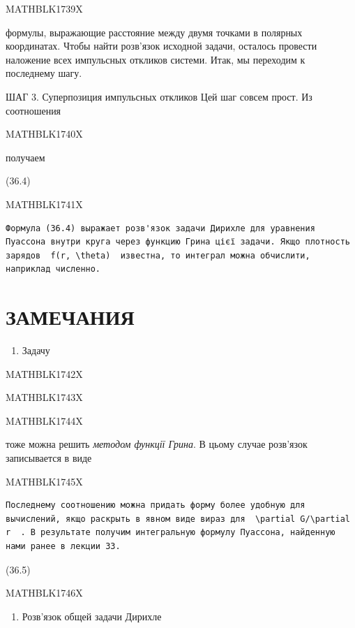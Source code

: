 \documentclass[
  ukrainian,
]{article}
\providecommand{\tightlist}{%
  \setlength{\itemsep}{0pt}\setlength{\parskip}{0pt}}
\begin{document}
MATHBLK1739X

формулы, выражающие расстояние между двумя точками в полярных
координатах. Чтобы найти розв'язок исходной задачи, осталось провести
наложение всех импульсных откликов системи. Итак, мы переходим к
последнему шагу.

ШАГ 3. Суперпозиция импульсных откликов Цей шаг совсем прост. Из
соотношения

MATHBLK1740X

получаем

(36.4)

MATHBLK1741X

\begin{verbatim}
Формула (36.4) выражает розв'язок задачи Дирихле для уравнения Пуассона внутри круга через функцию Грина цієї задачи. Якщо плотность зарядов  f(r, \theta)  известна, то интеграл можна обчислити, наприклад численно.
\end{verbatim}

\section{ЗАМЕЧАНИЯ}\label{ux437ux430ux43cux435ux447ux430ux43dux438ux44f-11}

\begin{enumerate}
\def\labelenumi{\arabic{enumi}.}
\tightlist
\item
  Задачу
\end{enumerate}

MATHBLK1742X

MATHBLK1743X

MATHBLK1744X

тоже можна решить \emph{методом функції Грина}. В цьому случае розв'язок
записывается в виде

MATHBLK1745X

\begin{verbatim}
Последнему соотношению можна придать форму более удобную для вычислений, якщо раскрыть в явном виде вираз для  \partial G/\partial r  . В результате получим интегральную формулу Пуассона, найденную нами ранее в лекции 33.
\end{verbatim}

(36.5)

MATHBLK1746X

\begin{enumerate}
\def\labelenumi{\arabic{enumi}.}
\setcounter{enumi}{1}
\tightlist
\item
  Розв'язок общей задачи Дирихле
\end{enumerate}
\end{document}
